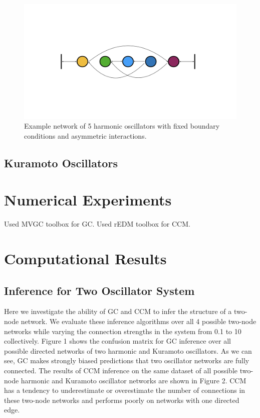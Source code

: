 \documentclass[]{article}
\begin{document}
\begin{figure}[H]
    \centering
    \includegraphics[width=14cm]{AsymmetricExampleNetwork.jpeg}
    \caption{Example network of 5 harmonic oscillators with fixed boundary conditions and asymmetric interactions.}
    \label{fig:example}
\end{figure}


\subsection{Kuramoto Oscillators}



\section{Numerical Experiments}
Used MVGC toolbox for GC. Used rEDM toolbox for CCM.


\renewcommand{\thesubsection}{\Alph{subsection}}
\section{Computational Results}
\subsection{Inference for Two Oscillator System}
Here we investigate the ability of GC and CCM to infer the structure of a two-node network. We evaluate these inference algorithms over all 4 possible two-node networks while varying the connection strengths in the system from 0.1 to 10 collectively. Figure 1 shows the confusion matrix for GC inference over all possible directed networks of two harmonic and Kuramoto oscillators. As we can see, GC makes strongly biased predictions that two oscillator networks are fully connected. The results of CCM inference on the same dataset of all possible two-node harmonic and Kuramoto oscillator networks are shown in Figure 2. CCM has a tendency to underestimate or overestimate the number of connections in these two-node networks and performs poorly on networks with one directed edge.
\end{document}
